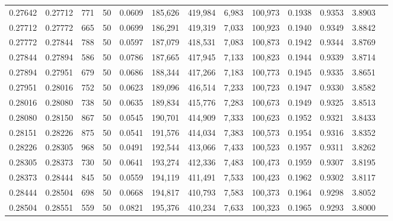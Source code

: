 \begin{tabular}{rrrrrrrrrrrrr}
0.27642 & 0.27712 &   771 &  50 &                                     0.0609 & 185,626 & 419,984 &   6,983 & 100,973 & 0.1938 & 0.9353 & 3.8903 \\
0.27712 & 0.27772 &   665 &  50 &                                     0.0699 & 186,291 & 419,319 &   7,033 & 100,923 & 0.1940 & 0.9349 & 3.8842 \\
0.27772 & 0.27844 &   788 &  50 &                                     0.0597 & 187,079 & 418,531 &   7,083 & 100,873 & 0.1942 & 0.9344 & 3.8769 \\
0.27844 & 0.27894 &   586 &  50 &                                     0.0786 & 187,665 & 417,945 &   7,133 & 100,823 & 0.1944 & 0.9339 & 3.8714 \\
0.27894 & 0.27951 &   679 &  50 &                                     0.0686 & 188,344 & 417,266 &   7,183 & 100,773 & 0.1945 & 0.9335 & 3.8651 \\
0.27951 & 0.28016 &   752 &  50 &                                     0.0623 & 189,096 & 416,514 &   7,233 & 100,723 & 0.1947 & 0.9330 & 3.8582 \\
0.28016 & 0.28080 &   738 &  50 &                                     0.0635 & 189,834 & 415,776 &   7,283 & 100,673 & 0.1949 & 0.9325 & 3.8513 \\
0.28080 & 0.28150 &   867 &  50 &                                     0.0545 & 190,701 & 414,909 &   7,333 & 100,623 & 0.1952 & 0.9321 & 3.8433 \\
0.28151 & 0.28226 &   875 &  50 &                                     0.0541 & 191,576 & 414,034 &   7,383 & 100,573 & 0.1954 & 0.9316 & 3.8352 \\
0.28226 & 0.28305 &   968 &  50 &                                     0.0491 & 192,544 & 413,066 &   7,433 & 100,523 & 0.1957 & 0.9311 & 3.8262 \\
0.28305 & 0.28373 &   730 &  50 &                                     0.0641 & 193,274 & 412,336 &   7,483 & 100,473 & 0.1959 & 0.9307 & 3.8195 \\
0.28373 & 0.28444 &   845 &  50 &                                     0.0559 & 194,119 & 411,491 &   7,533 & 100,423 & 0.1962 & 0.9302 & 3.8117 \\
0.28444 & 0.28504 &   698 &  50 &                                     0.0668 & 194,817 & 410,793 &   7,583 & 100,373 & 0.1964 & 0.9298 & 3.8052 \\
0.28504 & 0.28551 &   559 &  50 &                                     0.0821 & 195,376 & 410,234 &   7,633 & 100,323 & 0.1965 & 0.9293 & 3.8000 \\

\end{tabular}
